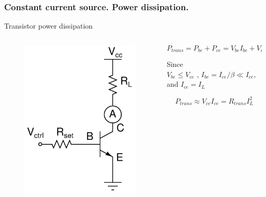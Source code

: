 \documentclass[beamer]{standalone}
\begin{document}
\begin{frame}
\begin{columns}[c]
\begin{column}{.25\textwidth}
\begin{figure}
			\end{figure}
		\end{column}
	\end{columns}
\end{frame}

\begin{frame}
\frametitle{Constant current source. Power dissipation.}
			Transistor power dissipation
	\begin{columns}[c]
		\begin{column}{.25\textwidth}
			\begin{figure}
				\includegraphics[height=0.30\textheight]{./schematics/npn_constant_current_source.pdf}
			\end{figure}
		\end{column}
		\begin{column}{.6\textwidth}

			\[P_{trans} = P_{be} + P_{ce} = V_{be} I_{be} + V_{ce} I_{ce} \]

			Since \\
			$V_{be} \le V_{ce}$ , $I_{be} = I_{ce}/\beta \ll I_{ce}$, and
			$I_{ce}=I_L$

			\[P_{trans} \approx  V_{ce} I_{ce} = R_{trans} I^2_{L}\]



\end{column}
\end{columns}
\end{frame}
\end{document}

